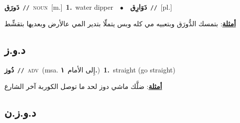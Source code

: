 \documentclass[10pt,a4paper,twoside]{article} %
\begin{document}
\begin{multicols}{2}
{\setlength\topsep{0pt}\textbf{\foreignlanguage{arabic}{دَورَق}}\ {\color{gray}\texttt{//}\color{black}}\ \textsc{noun}\ [m.]\ \textbf{1.}~water dipper\ \ $\bullet$\ \ \setlength\topsep{0pt}\textbf{\foreignlanguage{arabic}{دَوَارِق}}\ {\color{gray}\texttt{//}\color{black}}\ [pl.]\  \begin{flushright}\color{gray}\foreignlanguage{arabic}{\textbf{\underline{\foreignlanguage{arabic}{أمثلة}}}: بتمسك الدُّورَق وبتعبيه مي كله وبس يتملّا بتدير المي عالأرض وبعديها بتقشِّط}\end{flushright}\color{black}} \vspace{2mm}

\vspace{-3mm}
\subsection*{\color{blue}\foreignlanguage{arabic}{د.و.ز}\color{blue}{ (ntws)}} 

{\setlength\topsep{0pt}\textbf{\foreignlanguage{arabic}{دُوز}}\ {\color{gray}\texttt{//}\color{black}}\ \textsc{adv}\ \color{gray}(msa. \foreignlanguage{arabic}{إِلى الأمام}~\foreignlanguage{arabic}{\textbf{١.}})\color{black}\ \textbf{1.}~straight (go straight)\  \begin{flushright}\color{gray}\foreignlanguage{arabic}{\textbf{\underline{\foreignlanguage{arabic}{أمثلة}}}: ضلَّك ماشي دوز لحد ما توصل الكوربة آخر الشارع}\end{flushright}\color{black}} \vspace{2mm}

\vspace{-3mm}
\subsection*{\color{blue}\foreignlanguage{arabic}{د.و.ز.ن}\color{blue}{}} 


\end{multicols}
\end{document}

